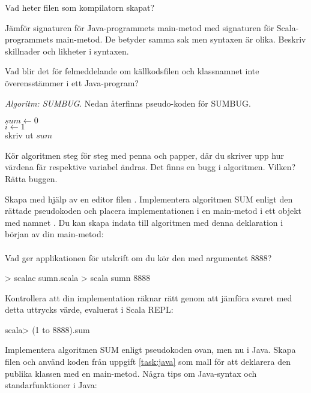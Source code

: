 \Subtask\Pen Vad heter filen som kompilatorn skapat?

\Subtask\Pen Jämför signaturen för Java-programmets main-metod med signaturen för Scala-programmets main-metod. De betyder samma sak men syntaxen är olika. Beskriv skillnader och likheter i syntaxen.

\Subtask\Pen Vad blir det för felmeddelande om källkodsfilen och klassnamnet inte överensstämmer i ett Java-program?


\Task \emph{Algoritm: SUMBUG}. Nedan återfinns pseudo-koden för SUMBUG. 

\begin{algorithm}[H]
 
 $sum \leftarrow 0$ \\
 $i \leftarrow 1$  \\
 skriv ut $sum$
\end{algorithm}

\Subtask\Pen Kör algoritmen steg för steg med penna och papper, där du skriver upp hur värdena fär respektive variabel ändras. Det finns en bugg i algoritmen. Vilken? Rätta buggen.

\Subtask Skapa med hjälp av en editor filen . Implementera algoritmen SUM enligt den rättade pseudokoden och placera implementationen i en main-metod i ett objekt med namnet . Du kan skapa indata  till algoritmen med denna deklaration i början av din main-metod: \\  \\ Vad ger applikationen för utskrift om du kör den med argumentet 8888? 

\begin{REPL}
> scalac sumn.scala
> scala sumn 8888
\end{REPL}

\Subtask Kontrollera att din implementation räknar rätt genom att jämföra svaret med detta uttrycks värde, evaluerat i Scala REPL:
\begin{REPL}
scala> (1 to 8888).sum
\end{REPL}

\Subtask Implementera algoritmen SUM enligt pseudokoden ovan, men nu i Java. Skapa filen  och använd koden från uppgift \ref{task:java} som mall för att deklarera den publika klassen  med en main-metod. Några tips om Java-syntax och standarfunktioner i Java: 

